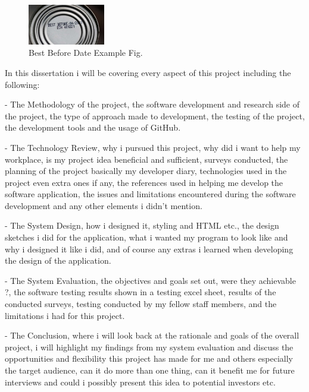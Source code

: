 \newpage

\begin{figure}[h!]
	\caption{Best Before Date Example Fig.}
	\label{image:bbdate}
	\centering
	\includegraphics[width=0.3\textwidth]{images/bbdate.jpg}
\end{figure}

In this dissertation i will be covering every aspect of this project including the following:
\newline 

- The Methodology of the project, the software development and research side of the project, the type of approach made to development, the testing of the project, the development tools and the usage of GitHub.
\newline

- The Technology Review, why i pursued this project, why did i want to help my workplace, is my project idea beneficial and sufficient, surveys conducted, the planning of the project basically my developer diary, technologies used in the project even extra ones if any, the references used in helping me develop the software application, the issues and limitations encountered during the software development and any other elements i didn't mention.
\newline

- The System Design, how i designed it, styling and HTML etc., the design sketches i did for the application, what i wanted my program to look like and why i designed it like i did, and of course any extras i learned when developing the design of the application.
\newline

- The System Evaluation, the objectives and goals set out, were they achievable ?, the software testing results shown in a testing excel sheet, results of the conducted surveys, testing conducted by my fellow staff members, and the limitations i had for this project.
\newline

- The Conclusion, where i will look back at the rationale and goals of the overall project, i will highlight my findings from my system evaluation and discuss the opportunities and flexibility this project has made for me and others especially the target audience, can it do more than one thing, can it benefit me for future interviews and could i possibly present this idea to potential investors etc.
\newline

